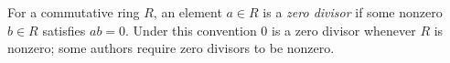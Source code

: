 
For a commutative ring $R$, an element $a\in R$ is a \emph{zero divisor} if some nonzero $b\in R$ satisfies $ab=0$. Under this convention $0$ is a zero divisor whenever $R$ is nonzero; some authors require zero divisors to be nonzero.
